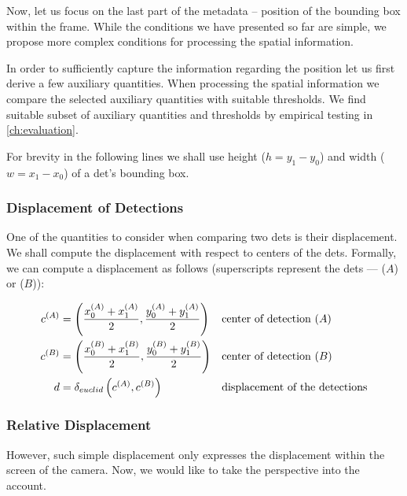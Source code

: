 \label{ssec:spatial_merging}

Now, let us focus on the last part of the metadata -- position of the bounding box within the frame. While the conditions we have presented so far are simple, we propose more complex conditions for processing the spatial information.

In order to sufficiently capture the information regarding the position let us first derive a few auxiliary quantities. When processing the spatial information we compare the selected auxiliary quantities with suitable thresholds. We find suitable subset of auxiliary quantities and thresholds by empirical testing in \autoref{ch:evaluation}.

For brevity in the following lines we shall use height ($h = y_1 - y_0$) and
width ($w = x_1 - x_0$) of a \gls{det}'s bounding box.

\subsubsection{Displacement of Detections}

One of the quantities to consider when comparing two \glspl{det} is
their displacement. We shall compute the displacement with respect to centers
of the \glspl{det}. Formally, we can compute a displacement as follows
(superscripts represent the \glspl{det} --- ($A$) or ($B$)):

\begin{align*}
    c^{(A)} &= \left(\frac{x_0^{(A)} + x_1^{(A)}}{2}, \frac{y_0^{(A)} + y_1^{(A)}}{2}\right) &\vspace{1cm}&\text{center of detection }(A)\\
    c^{(B)} &= \left(\frac{x_0^{(B)} + x_1^{(B)}}{2}, \frac{y_0^{(B)} + y_1^{(B)}}{2}\right) &\vspace{1cm}&\text{center of detection }(B)\\
    d &= \delta_{euclid}\left(c^{(A)}, c^{(B)}\right)&\vspace{1cm}&\text{displacement of the detections}
\end{align*}

\subsubsection{Relative Displacement}

However, such simple displacement only expresses the displacement within the screen of the camera. Now, we would like to take the perspective into the account.

